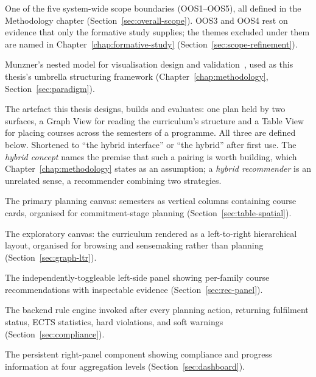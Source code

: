 \begin{description}
  \label{gls:oos}
  \item[OOS (Out of Scope)] One of the five system-wide scope boundaries (OOS1--OOS5), all defined in the Methodology chapter (Section~\ref{sec:overall-scope}). OOS3 and OOS4 rest on evidence that only the formative study supplies; the themes excluded under them are named in Chapter~\ref{chap:formative-study} (Section~\ref{sec:scope-refinement}).
  \label{gls:nested-model}
  \item[Nested model] Munzner's nested model for visualisation design and validation~\cite{munzner2009}, used as this thesis's umbrella structuring framework (Chapter~\ref{chap:methodology}, Section~\ref{sec:paradigm}).
  \label{gls:hybrid-interface}
  \item[Hybrid graph-table interface] The artefact this thesis designs, builds and evaluates: one plan held by two surfaces, a Graph View for reading the curriculum's structure and a Table View for placing courses across the semesters of a programme. All three are defined below. Shortened to \enquote{the hybrid interface} or \enquote{the hybrid} after first use. The \emph{hybrid concept} names the premise that such a pairing is worth building, which Chapter~\ref{chap:methodology} states as an assumption; a \emph{hybrid recommender} is an unrelated sense, a recommender combining two strategies.
  \label{gls:table-view}
  \item[Table View] The primary planning canvas: semesters as vertical columns containing course cards, organised for commitment-stage planning (Section~\ref{sec:table-spatial}).
  \label{gls:graph-view}
  \item[Graph View] The exploratory canvas: the curriculum rendered as a left-to-right hierarchical layout, organised for browsing and sensemaking rather than planning (Section~\ref{sec:graph-ltr}).
  \label{gls:recommendation-panel}
  \item[Recommendation Panel] The independently-toggleable left-side panel showing per-family course recommendations with inspectable evidence (Section~\ref{sec:rec-panel}).
  \label{gls:compliance-engine}
  \item[Compliance Engine] The backend rule engine invoked after every planning action, returning fulfilment status, ECTS statistics, hard violations, and soft warnings (Section~\ref{sec:compliance}).
  \label{gls:dashboard}
  \item[Dashboard] The persistent right-panel component showing compliance and progress information at four aggregation levels (Section~\ref{sec:dashboard}).

\end{description}

